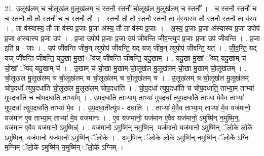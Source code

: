 \documentclass[17pt]{extarticle}
\begin{document}
21. उ॒लूख॑लम् च चो॒लूख॑ल मु॒लूख॑लम् च॒ स्तनौ॒ स्तनौ॑ चो॒लूख॑ल मु॒लूख॑लम् च॒ स्तनौ᳚ । . च॒ स्तनौ॒ स्तनौ॑ च च॒ स्तनौ॒ तौ तौ स्तनौ॑ च च॒ स्तनौ॒ तौ । . स्तनौ॒ तौ तौ स्तनौ॒ स्तनौ॒ ता व॑स्यास्य॒ तौ स्तनौ॒ स्तनौ॒ ता व॑स्य । . ता व॑स्यास्य॒ तौ ता व॑स्य प्र॒जाः प्र॒जा अ॑स्य॒ तौ ता व॑स्य प्र॒जाः । . अ॒स्य॒ प्र॒जाः प्र॒जा अ॑स्यास्य प्र॒जा उपोप॑ प्र॒जा अ॑स्यास्य प्र॒जा उप॑ । . प्र॒जा उपोप॑ प्र॒जाः प्र॒जा उप॑ जीवन्ति जीव॒न्त्युप॑ प्र॒जाः प्र॒जा उप॑ जीवन्ति । . प्र॒जा इति॑ प्र - जाः । . उप॑ जीवन्ति जीव॒न् त्युपोप॑ जीवन्ति॒ यद् यज् जी॑व॒न् त्युपोप॑ जीवन्ति॒ यत् । . जी॒व॒न्ति॒ यद् यज् जी॑वन्ति जीवन्ति॒ यदु॒खा मु॒खां ॅयज् जी॑वन्ति जीवन्ति॒ यदु॒खाम् । . यदु॒खा मु॒खां ॅयद् यदु॒खाम् च॑ चो॒खां ॅयद् यदु॒खाम् च॑ । . उ॒खाम् च॑ चो॒खा मु॒खाम् चो॒लूख॑ल मु॒लूख॑लम् चो॒खा मु॒खाम् चो॒लूख॑लम् । . चो॒लूख॑ल मु॒लूख॑लम् च चो॒लूख॑लम् च चो॒लूख॑लम् च चो॒लूख॑लम् च । . उ॒लूख॑लम् च चो॒लूख॑ल मु॒लूख॑लम् चोप॒दधा᳚ त्युप॒दधा॑ति चो॒लूख॑ल मु॒लूख॑लम् चोप॒दधा॑ति । . चो॒प॒दधा᳚ त्युप॒दधा॑ति च चोप॒दधा॑ति॒ ताभ्या॒म् ताभ्या॑ मुप॒दधा॑ति च चोप॒दधा॑ति॒ ताभ्या᳚म् । . उ॒प॒दधा॑ति॒ ताभ्या॒म् ताभ्या॑ मुप॒दधा᳚ त्युप॒दधा॑ति॒ ताभ्या॑ मे॒वैव ताभ्या॑ मुप॒दधा᳚ त्युप॒दधा॑ति॒ ताभ्या॑ मे॒व । . उ॒प॒दधा॒तीत्यु॑प - दधा॑ति । . ताभ्या॑ मे॒वैव ताभ्या॒म् ताभ्या॑ मे॒व यज॑मानो॒ यज॑मान ए॒व ताभ्या॒म् ताभ्या॑ मे॒व यज॑मानः । . ए॒व यज॑मानो॒ यज॑मान ए॒वैव यज॑मानो॒ ऽमुष्मि॑न् न॒मुष्मि॒न्॒. यज॑मान ए॒वैव यज॑मानो॒ ऽमुष्मिन्न्॑ । . यज॑मानो॒ ऽमुष्मि॑न् न॒मुष्मि॒न्॒. यज॑मानो॒ यज॑मानो॒ ऽमुष्मि॑न् ॅलो॒के लो॒के॑ ऽमुष्मि॒न्॒. यज॑मानो॒ यज॑मानो॒ ऽमुष्मि॑न् ॅलो॒के । . अ॒मुष्मि॑न् ॅलो॒के लो॒के॑ ऽमुष्मि॑न् न॒मुष्मि॑न् ॅलो॒के᳚ ऽग्नि म॒ग्निम् ॅलो॒के॑ ऽमुष्मि॑न् न॒मुष्मि॑न् ॅलो॒के᳚ ऽग्निम् । \newline
\end{document}
